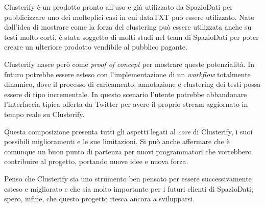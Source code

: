 	Clusterify è un prodotto pronto all'uso e già utilizzato da SpazioDati per pubblicizzare  uno dei molteplici casi in cui dataTXT può essere utilizzato. Nato dall'idea di mostrare come la forza del clustering può essere utilizzata anche su testi molto corti, è stata soggetto di molti studi nel team di SpazioDati per poter creare un ulteriore prodotto vendibile al pubblico pagante.

	Clusterify nasce però come \emph{proof of concept} per mostrare queste potenzialità. In futuro potrebbe essere esteso con l'implementazione di un \emph{workflow} totalmente dinamico, dove il processo di caricamento, annotazione e clustering dei testi possa essere di tipo incrementale. In questo scenario l'utente potrebbe abbandonare l'interfaccia tipica offerta da Twitter per avere il proprio stream aggiornato in tempo reale su Clusterify.

	Questa composizione presenta tutti gli aspetti legati al \emph{core} di Clusterify, i suoi possibili miglioramenti e le sue limitazioni. Si può anche affermare che è comunque un buon punto di partenza per nuovi programmatori che vorrebbero contribuire al progetto, portando nuove idee e nuova forza.

	Penso che Clusterify sia uno strumento ben pensato per essere successivamente esteso e migliorato e che sia molto importante per i futuri clienti di SpazioDati; spero, infine, che questo progetto riesca ancora a svilupparsi.